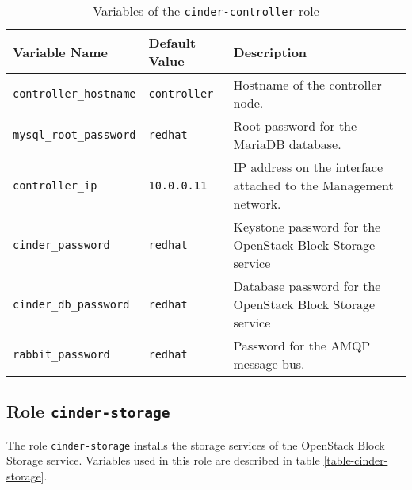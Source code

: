 \begin{table}[!h]
  \centering
  \begin{tabular}{|l|l|p{5cm}|}\hline
    Variable Name & Default Value & Description \\\hline
    \texttt{controller\_hostname} & \texttt{controller} & Hostname of the controller node. \\\hline

    \texttt{mysql\_root\_password} & \texttt{redhat} & Root password for the MariaDB database. \\\hline
    \texttt{controller\_ip} & \texttt{10.0.0.11} & IP address on the interface attached to the Management network. \\\hline

    \texttt{cinder\_password} & \texttt{redhat} & Keystone password for the OpenStack Block Storage service \\\hline
    \texttt{cinder\_db\_password} & \texttt{redhat} & Database password for the OpenStack Block Storage service \\\hline

    \texttt{rabbit\_password} & \texttt{redhat} & Password for the AMQP message bus. \\\hline

  \end{tabular}
\caption{Variables of the \texttt{cinder-controller} role}
\label{table-cinder-controller}
\end{table}

\clearpage

\subsection{Role \texttt{cinder-storage}}

The role \texttt{cinder-storage} installs the storage services of the OpenStack Block Storage service. Variables used in this role are described in table \ref{table-cinder-storage}.

